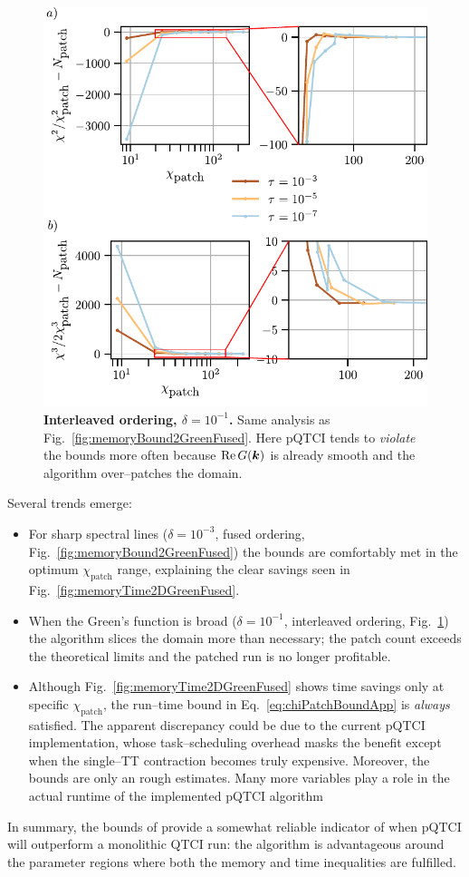 \begin{figure}
    \centering
    \includegraphics{figures/2DGreenMemoryTimeMemoryBoundInterleaved.pdf}
    \caption{\textbf{Interleaved ordering, \(\delta=10^{-1}\).}
    Same analysis as Fig.~\ref{fig:memoryBound2GreenFused}.
    Here pQTCI tends to \emph{violate} the bounds more often because \(\operatorname{Re}G(\boldsymbol{k})\) is already smooth and the algorithm over–patches the domain.}
    \label{fig:memoryBound2GreenInterleaved}
\end{figure}

Several trends emerge:

\begin{itemize}
  \item For sharp spectral lines (\(\delta=10^{-3}\), fused ordering,
        Fig.~\ref{fig:memoryBound2GreenFused}) the bounds are comfortably
        met in the optimum \(\chi_{\text{patch}}\) range, explaining the
        clear savings seen in Fig.~\ref{fig:memoryTime2DGreenFused}.
  \item When the Green’s function is broad (\(\delta=10^{-1}\), interleaved
        ordering, Fig.~\ref{fig:memoryBound2GreenInterleaved}) the algorithm
        slices the domain more than necessary; the patch count exceeds the
        theoretical limits and the patched run is no longer profitable.
  \item Although Fig.~\ref{fig:memoryTime2DGreenFused} shows time savings
        only at specific \(\chi_{\text{patch}}\), the run–time bound in
        Eq.~\eqref{eq:chiPatchBoundApp} is \emph{always} satisfied.  The
        apparent discrepancy could be due to the current pQTCI implementation, whose task–scheduling overhead masks the benefit except when the single–TT contraction becomes truly expensive. Moreover, the bounds are only an rough estimates. Many more variables play a role in the actual runtime of the implemented pQTCI algorithm
\end{itemize}

In summary, the bounds of  provide a somewhat reliable
indicator of when pQTCI will outperform a monolithic QTCI run: the algorithm is advantageous around the parameter regions where both the memory and time inequalities are fulfilled.